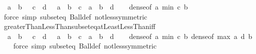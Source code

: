 \begin{isabellebody}
\ \ {\isachardoublequoteopen}{\isacharbraceleft}{\kern0pt}a\ {\isacharless}{\kern0pt}{\isachardot}{\kern0pt}{\isachardot}{\kern0pt}\ b{\isacharbraceright}{\kern0pt}\ {\isasymsubseteq}\ {\isacharbraceleft}{\kern0pt}\ c\ {\isachardot}{\kern0pt}{\isachardot}{\kern0pt}{\isacharless}{\kern0pt}\ d\ {\isacharbraceright}{\kern0pt}\ {\isasymlongleftrightarrow}\ {\isacharparenleft}{\kern0pt}a\ {\isacharless}{\kern0pt}\ b\ {\isasymlongrightarrow}\ c\ {\isasymle}\ a\ {\isasymand}\ b\ {\isacharless}{\kern0pt}\ d{\isacharparenright}{\kern0pt}{\isachardoublequoteclose}\isanewline
%
\isadelimproof
\ \ %
\endisadelimproof
%
\isatagproof
{}\isamarkupfalse%
\ dense{\isacharbrackleft}{\kern0pt}of\ {\isachardoublequoteopen}a{\isachardoublequoteclose}\ {\isachardoublequoteopen}min\ c\ b{\isachardoublequoteclose}{\isacharbrackright}{\kern0pt}\isanewline
\ \ \isamarkupfalse%
\ {\isacharparenleft}{\kern0pt}force\ simp{\isacharcolon}{\kern0pt}\ subset{\isacharunderscore}{\kern0pt}eq\ Ball{\isacharunderscore}{\kern0pt}def\ not{\isacharunderscore}{\kern0pt}less{\isacharbrackleft}{\kern0pt}symmetric{\isacharbrackright}{\kern0pt}{\isacharparenright}{\kern0pt}%
\endisatagproof
{\isafoldproof}%
%
\isadelimproof
\isanewline
%
\endisadelimproof
\isanewline
{}\isamarkupfalse%
\ greaterThanLessThan{\isacharunderscore}{\kern0pt}subseteq{\isacharunderscore}{\kern0pt}atLeastLessThan{\isacharunderscore}{\kern0pt}iff{\isacharcolon}{\kern0pt}\isanewline
\ \ {\isachardoublequoteopen}{\isacharbraceleft}{\kern0pt}a\ {\isacharless}{\kern0pt}{\isachardot}{\kern0pt}{\isachardot}{\kern0pt}{\isacharless}{\kern0pt}\ b{\isacharbraceright}{\kern0pt}\ {\isasymsubseteq}\ {\isacharbraceleft}{\kern0pt}\ c\ {\isachardot}{\kern0pt}{\isachardot}{\kern0pt}{\isacharless}{\kern0pt}\ d\ {\isacharbraceright}{\kern0pt}\ {\isasymlongleftrightarrow}\ {\isacharparenleft}{\kern0pt}a\ {\isacharless}{\kern0pt}\ b\ {\isasymlongrightarrow}\ c\ {\isasymle}\ a\ {\isasymand}\ b\ {\isasymle}\ d{\isacharparenright}{\kern0pt}{\isachardoublequoteclose}\isanewline
%
\isadelimproof
\ \ %
\endisadelimproof
%
\isatagproof
{}\isamarkupfalse%
\ dense{\isacharbrackleft}{\kern0pt}of\ {\isachardoublequoteopen}a{\isachardoublequoteclose}\ {\isachardoublequoteopen}min\ c\ b{\isachardoublequoteclose}{\isacharbrackright}{\kern0pt}\ dense{\isacharbrackleft}{\kern0pt}of\ {\isachardoublequoteopen}max\ a\ d{\isachardoublequoteclose}\ {\isachardoublequoteopen}b{\isachardoublequoteclose}{\isacharbrackright}{\kern0pt}\isanewline
\ \ \isamarkupfalse%
\ {\isacharparenleft}{\kern0pt}force\ simp{\isacharcolon}{\kern0pt}\ subset{\isacharunderscore}{\kern0pt}eq\ Ball{\isacharunderscore}{\kern0pt}def\ not{\isacharunderscore}{\kern0pt}less{\isacharbrackleft}{\kern0pt}symmetric{\isacharbrackright}{\kern0pt}{\isacharparenright}{\kern0pt}%

\end{isabellebody}
